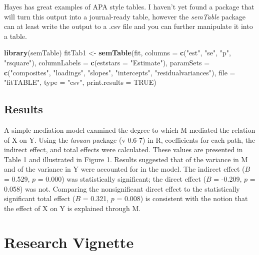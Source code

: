 \documentclass[
  11pt,
]{book}
\newenvironment{Shaded}{\begin{snugshade}}{\end{snugshade}}
\newcommand{\AttributeTok}[1]{\textcolor[rgb]{0.27,0.27,0.27}{#1}}
\newcommand{\ConstantTok}[1]{\textcolor[rgb]{0.37,0.37,0.37}{#1}}
\newcommand{\FunctionTok}[1]{\textcolor[rgb]{0.27,0.27,0.27}{\textbf{#1}}}
\newcommand{\NormalTok}[1]{#1}
\newcommand{\OtherTok}[1]{\textcolor[rgb]{0.37,0.37,0.37}{#1}}
\newcommand{\StringTok}[1]{\textcolor[rgb]{0.5,0.5,0.5}{#1}}
\begin{document}
Hayes has great examples of APA style tables. I haven't yet found a package that will turn this output into a journal-ready table, however the \emph{semTable} package can at least write the output to a .csv file and you can further manipulate it into a table.

\begin{Shaded}
\begin{Highlighting}[]
\FunctionTok{library}\NormalTok{(semTable)}
\NormalTok{fitTab1 }\OtherTok{\textless{}{-}} \FunctionTok{semTable}\NormalTok{(fit, }\AttributeTok{columns =} \FunctionTok{c}\NormalTok{(}\StringTok{"est"}\NormalTok{, }\StringTok{"se"}\NormalTok{, }\StringTok{"p"}\NormalTok{, }\StringTok{"rsquare"}\NormalTok{),  }\AttributeTok{columnLabels =} \FunctionTok{c}\NormalTok{(}\AttributeTok{eststars =} \StringTok{"Estimate"}\NormalTok{), }\AttributeTok{paramSets =} \FunctionTok{c}\NormalTok{(}\StringTok{"composites"}\NormalTok{, }\StringTok{"loadings"}\NormalTok{, }\StringTok{"slopes"}\NormalTok{, }\StringTok{"intercepts"}\NormalTok{, }\StringTok{"residualvariances"}\NormalTok{), }\AttributeTok{file =} \StringTok{"fitTABLE"}\NormalTok{, }\AttributeTok{type =} \StringTok{"csv"}\NormalTok{, }\AttributeTok{print.results =} \ConstantTok{TRUE}\NormalTok{)}
\end{Highlighting}
\end{Shaded}

\hypertarget{results-3}{%
\subsection{Results}\label{results-3}}

A simple mediation model examined the degree to which M mediated the relation of X on Y. Using the \emph{lavaan} package (v 0.6-7) in R, coefficients for each path, the indirect effect, and total effects were calculated. These values are presented in Table 1 and illustrated in Figure 1. Results suggested that of the variance in M and of the variance in Y were accounted for in the model. The indirect effect (\(B\) = 0.529, \(p\) = 0.000) was statistically significant; the direct effect (\(B\) = -0.209, \(p\) = 0.058) was not. Comparing the nonsignificant direct effect to the statistically significant total effect (\(B\) = 0.321, \(p\) = 0.008) is consistent with the notion that the effect of X on Y is explained through M.

\hypertarget{research-vignette-4}{%
\section{Research Vignette}\label{research-vignette-4}}
\end{document}
